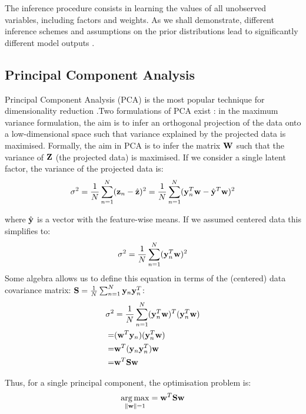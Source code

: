 The inference procedure consists in learning the values of all unobserved variables, including factors and weights. As we shall demonstrate, different inference schemes and assumptions on the prior distributions lead to significantly different model outputs \cite{Rattray2009}.


\subsection{Principal Component Analysis} \label{section:pca}

Principal Component Analysis (PCA) is the most popular technique for dimensionality reduction \cite{Hotelling1933,Ringner2008}.Two formulations of PCA exist \cite{Bishop2006}: in the maximum variance formulation, the aim is to infer an orthogonal projection of the data onto a low-dimensional space such that variance explained by the projected data is maximised. Formally, the aim in PCA is to infer the matrix ${\bf W}$ such that the variance of ${\bf Z}$ (the projected data) is maximised. If we consider a single latent factor, the variance of the projected data is:
\begin{equation*}
	\sigma^2 = \frac{1}{N}\sum_{n=1}^{N} ({\bf z}_n - \hat{{\bf z}})^{2} = \frac{1}{N}\sum_{n=1}^{N} ({\bf y}_n^T {\bf w} - \hat{{\bf y}}^T{\bf w})^{2}
\end{equation*}

where $\hat{{\bf y}}$ is a vector with the feature-wise means. If we assumed centered data this simplifies to:
\begin{equation*}
	\sigma^2 = \frac{1}{N}\sum_{n=1}^{N} ({\bf y}_n^T {\bf w})^{2}
\end{equation*}
Some algebra allows us to define this equation in terms of the (centered) data covariance matrix: ${\bf S} = \frac{1}{N}\sum_{n=1}^{N} {\bf y}_n{\bf y}_n^T$:
\begin{align*}
	\sigma^2 &= \frac{1}{N}\sum_{n=1}^{N} ({\bf y}_n^T {\bf w})^T ({\bf y}_n^T {\bf w}) \\
	=& ({\bf w}^T {\bf y}_n) ({\bf y}_n^T {\bf w}) \\
	=& {\bf w}^T ({\bf y}_n {\bf y}_n^T) {\bf w} \\
	=& {\bf w}^T {\bf S} {\bf w}
\end{align*}

Thus, for a single principal component, the optimisation problem is:
\begin{equation} \label{eq:pca}
	\operatorname*{arg\,max}_{\|{\bf w}\|=1} = {\bf w}^T {\bf S} {\bf w}
\end{equation}

